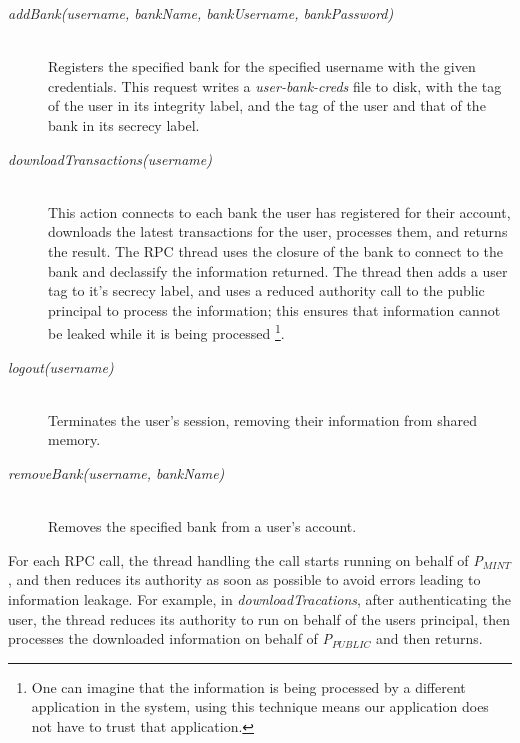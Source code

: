 \begin{description}
  \item[\emph{addBank(username, bankName, bankUsername, bankPassword)}] \ \\
    Registers the specified bank 
    for the specified username with the given 
    credentials.
    This request writes a \emph{user-bank-creds} 
    file to disk, with the tag of
    the user in its integrity label, and the 
    tag of the user and that of the bank
    in its secrecy label.
  \item[\emph{downloadTransactions(username)}] \ \\
    This action connects to each bank the 
    user has registered for their account, 
    downloads the latest transactions for the user, 
    processes them, and returns the result.
    The RPC thread uses the closure of the bank to
    connect to the bank and declassify the 
    information returned. The thread then
    adds a user tag to it's secrecy label, 
    and uses a reduced authority call to 
    the public principal to process the information; 
    this ensures that information
    cannot be leaked while it is being
    processed
    \footnote{One can imagine that the 
    information is being processed by a different
    application in the system, 
    using this technique means our application 
    does not have to trust that 
    application.}. 


  \item[\emph{logout(username)}] \ \\
    Terminates the user's session, removing 
    their information from shared memory.
  \item[\emph{removeBank(username, bankName)}] \ \\
    Removes the specified bank from a user's account.

\end{description}

\noindent
For each RPC call, the thread handling the call starts running on behalf of \emph{P$_{MINT}$}, and then reduces its authority as soon as possible to avoid errors leading to information leakage. For example, in \emph{downloadTracations}, after authenticating the user, the thread reduces its authority to run on behalf of the users principal, then processes the downloaded information on behalf of \emph{P$_{PUBLIC}$} and then returns.


